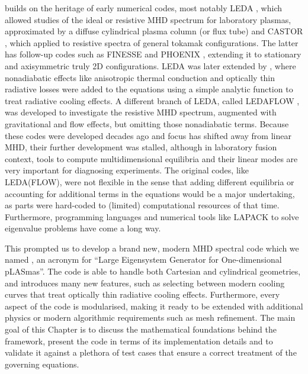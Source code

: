 {\legolas} builds on the heritage of early numerical codes, most notably LEDA \citep{kerner1985}, which allowed studies of the ideal or resistive MHD spectrum for laboratory plasmas, approximated by a diffuse cylindrical plasma column (or flux tube) and CASTOR \citep{kerner1998}, which applied to resistive spectra of general tokamak configurations. The latter has follow-up codes such as FINESSE \citep{belien2002} and PHOENIX \citep{blokland2007_phoenix}, extending it to stationary and axisymmetric truly \gls{2D} configurations. LEDA was later extended by \citet{vanderlinden1992}, where nonadiabatic effects like anisotropic thermal conduction and optically thin radiative losses were added to the equations using a simple analytic function to treat radiative cooling effects. A different branch of LEDA, called LEDAFLOW \citep{nijboer1997}, was developed to investigate the resistive MHD spectrum, augmented with gravitational and flow effects, but omitting those nonadiabatic terms. Because these codes were developed decades ago and focus has shifted away from linear MHD, their further development was stalled, although in laboratory fusion context, tools to compute multidimensional equilibria and their linear modes are very important for diagnosing experiments. The original codes, like LEDA(FLOW), were not flexible in the sense that adding different equilibria or accounting for additional terms in the equations would be a major undertaking, as parts were hard-coded to (limited) computational resources of that time. Furthermore, programming languages and numerical tools like LAPACK \citep{book_lapack} to solve eigenvalue problems have come a long way.

This prompted us to develop a brand new, modern MHD spectral code which we named {\legolas}, an acronym for ``Large Eigensystem Generator for One-dimensional pLASmas''. The {\legolas} code is able to handle both Cartesian and cylindrical geometries, and introduces many new features, such as selecting between modern cooling curves that treat optically thin radiative cooling effects. Furthermore, every aspect of the code is modularised, making it ready to be extended with additional physics or modern algorithmic requirements such as mesh refinement. The main goal of this Chapter is to discuss the mathematical foundations behind the {\legolas} framework, present the code in terms of its implementation details and to validate it against a plethora of test cases that ensure a correct treatment of the governing equations.

